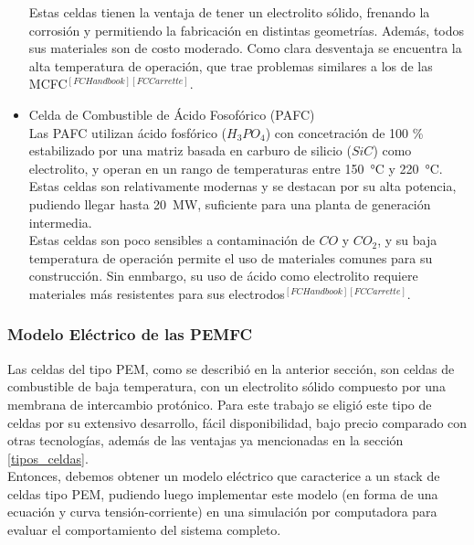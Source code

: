 \begin{itemize}
    Estas celdas tienen la ventaja de tener un electrolito sólido, frenando la corrosión y permitiendo la fabricación en distintas geometrías. Además, todos sus materiales son de costo moderado. Como clara desventaja se encuentra la alta temperatura de operación, que trae problemas similares a los de las MCFC$^{[FCHandbook][FCCarrette]}$.\\

    \item {\SemiBold Celda de Combustible de Ácido Fosofórico (PAFC)}\\

    Las PAFC utilizan ácido fosfórico ($H_3PO_4$) con concetración de 100 \% estabilizado por una matriz basada en carburo de silicio ($SiC$) como electrolito, y operan en un rango de temperaturas entre \SI{150}{\celsius} y \SI{220}{\celsius}. Estas celdas son relativamente modernas y se destacan por su alta potencia, pudiendo llegar hasta \SI{20}{\mega\watt}, suficiente para una planta de generación intermedia.\\

    Estas celdas son poco sensibles a contaminación de $CO$ y $CO_2$, y su baja temperatura de operación permite el uso de materiales comunes para su construcción. Sin enmbargo, su uso de ácido como electrolito requiere materiales más resistentes para sus electrodos$^{[FCHandbook][FCCarrette]}$.\\

\end{itemize}

\subsubsection{Modelo Eléctrico de las PEMFC}

Las celdas del tipo PEM, como se describió en la anterior sección, son celdas de combustible de baja temperatura, con un electrolito sólido compuesto por una membrana de intercambio protónico. Para este trabajo se eligió este tipo de celdas por su extensivo desarrollo, fácil disponibilidad, bajo precio comparado con otras tecnologías, además de las ventajas ya mencionadas en la sección \ref{tipos_celdas}.\\

Entonces, debemos obtener un modelo eléctrico que caracterice a un stack de celdas tipo PEM, pudiendo luego implementar este modelo (en forma de una ecuación y curva tensión-corriente) en una simulación por computadora para evaluar el comportamiento del sistema completo.\\

